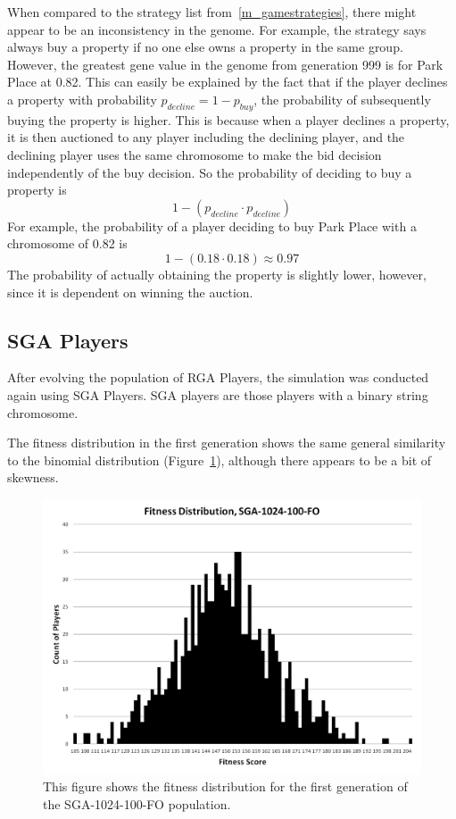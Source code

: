 When compared to the strategy list from~\ref{m_gamestrategies}, there might
appear to be an inconsistency in the genome. For example, the strategy says
always buy a property if no one else owns a property in the same group. However,
the greatest gene value in the genome from generation 999 is for Park Place at
0.82. This can easily be explained by the fact that if the player declines a
property with probability \(p_{decline} = 1-p_{buy}\), the probability of
subsequently buying the property is higher. This is because when a player
declines a property, it is then auctioned to any player including the declining
player, and the declining player uses the same chromosome to make the bid
decision independently of the buy decision. So the probability of deciding to
buy a property is
\begin{equation*}
1-(p_{decline} \cdot p_{decline})
\end{equation*}
For example, the probability of a player deciding to buy Park Place with a
chromosome of 0.82 is
\begin{equation*}
1-(0.18 \cdot 0.18) \approx 0.97
\end{equation*}
The probability of actually obtaining the property is slightly lower, however,
since it is dependent on winning the auction.

\subsection{SGA Players} \label{6_SGA}

After evolving the population of RGA Players, the simulation was conducted again
using SGA Players. SGA players are those players with a binary string
chromosome. 

The fitness distribution in the first generation shows the same general
similarity to the binomial distribution (Figure~\ref{figure-sga_gen0}), although
there appears to be a bit of skewness.

\begin{figure}[htp]
\centerline{\includegraphics[width=0.75\columnwidth]{Figures/SGA_1024_100_FO_gen0.png}}
\caption[SGA-1024-100-FO Fitness Generation 0]{This figure shows the fitness
distribution for the first generation of the SGA-1024-100-FO population.}
\label{figure-sga_gen0}
\end{figure}

